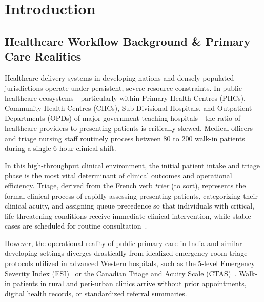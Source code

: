 \documentclass[11pt,a4paper,oneside]{report}
\begin{document}
\setcounter{page}{1}

\chapter{Introduction}

\section{Healthcare Workflow Background \& Primary Care Realities}
Healthcare delivery systems in developing nations and densely populated jurisdictions operate under persistent, severe resource constraints. In public healthcare ecosystems---particularly within Primary Health Centres (PHCs), Community Health Centres (CHCs), Sub-Divisional Hospitals, and Outpatient Departments (OPDs) of major government teaching hospitals---the ratio of healthcare providers to presenting patients is critically skewed. Medical officers and triage nursing staff routinely process between 80 to 200 walk-in patients during a single 6-hour clinical shift.

In this high-throughput clinical environment, the initial patient intake and triage phase is the most vital determinant of clinical outcomes and operational efficiency. Triage, derived from the French verb \textit{trier} (to sort), represents the formal clinical process of rapidly assessing presenting patients, categorizing their clinical acuity, and assigning queue precedence so that individuals with critical, life-threatening conditions receive immediate clinical intervention, while stable cases are scheduled for routine consultation~\cite{etat2016}.

However, the operational reality of public primary care in India and similar developing settings diverges drastically from idealized emergency room triage protocols utilized in advanced Western hospitals, such as the 5-level Emergency Severity Index (ESI)~\cite{esi2020} or the Canadian Triage and Acuity Scale (CTAS)~\cite{ctas1999}. Walk-in patients in rural and peri-urban clinics arrive without prior appointments, digital health records, or standardized referral summaries.
\end{document}
